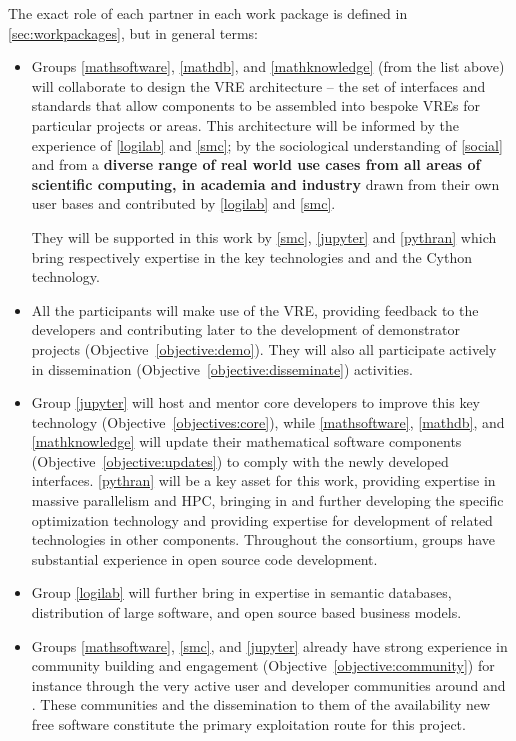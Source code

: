 The exact role of each partner in each work package is defined
in \ref{sec:workpackages}, but in general terms:
\begin{itemize}
\item Groups \ref{mathsoftware}, \ref{mathdb}, and
\ref{mathknowledge} (from the list above) will collaborate to design the \TheProject VRE
architecture -- the set of interfaces and standards that allow
components to be assembled into bespoke VREs for particular projects
or areas. This architecture will be informed  by the
experience of \ref{logilab} and \ref{smc}; by the sociological
understanding of \ref{social} and from a
\textbf{diverse range of real world use cases from all areas of scientific
  computing, in academia and industry} drawn from their own user bases
and contributed by \ref{logilab} and \ref{smc}.

They will be supported in this work by \ref{smc}, \ref{jupyter} and \ref{pythran} which
bring respectively expertise in the key technologies \SMC and \Jupyter and the Cython
technology.

\item All the participants will make use of the \TheProject VRE, providing feedback to the
  developers and contributing later to the development of demonstrator projects
  (Objective~\ref{objective:demo}). They will also all participate actively in
  dissemination (Objective~\ref{objective:disseminate}) activities.

\item Group \ref{jupyter} will host and mentor core \Jupyter developers to improve this
  key technology (Objective~\ref{objectives:core}), while \ref{mathsoftware},
  \ref{mathdb}, and \ref{mathknowledge} will update their mathematical software components
  (Objective~\ref{objective:updates}) to comply with the newly developed
  interfaces. \ref{pythran} will be a key asset for this work, providing expertise in
  massive parallelism and HPC, bringing in and further developing the specific \Pythran
  optimization technology and providing expertise for development of related technologies
  in other components.  Throughout the consortium, groups have substantial
  experience in open source code development.

\item Group \ref{logilab} will further bring in expertise in semantic databases,
  distribution of large software, and open source based business models.

\item Groups \ref{mathsoftware}, \ref{smc}, and \ref{jupyter} already
  have strong experience in community building and engagement
  (Objective~\ref{objective:community}) for instance through the very
  active user and developer communities around \GAP and \Sage. These
  communities and the dissemination to them of the availability new
  free software constitute the primary exploitation route for this
  project. 
\end{itemize}
